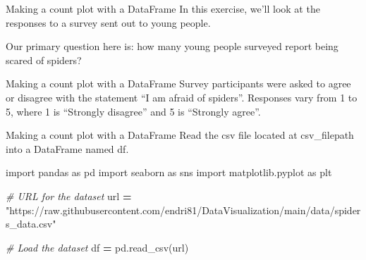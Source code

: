 \documentclass[
  ignorenonframetext,
]{beamer}
\newenvironment{Shaded}{\begin{snugshade}}{\end{snugshade}}
\newcommand{\CommentTok}[1]{\textcolor[rgb]{0.56,0.35,0.01}{\textit{#1}}}
\newcommand{\ImportTok}[1]{#1}
\newcommand{\NormalTok}[1]{#1}
\newcommand{\OperatorTok}[1]{\textcolor[rgb]{0.81,0.36,0.00}{\textbf{#1}}}
\newcommand{\StringTok}[1]{\textcolor[rgb]{0.31,0.60,0.02}{#1}}
\begin{document}
\begin{frame}{Making a count plot with a DataFrame}
\label{making-a-count-plot-with-a-dataframe}
In this exercise, we'll look at the responses to a survey sent out to
young people.

Our primary question here is: how many young people surveyed report
being scared of spiders?
\end{frame}

\begin{frame}{Making a count plot with a DataFrame}
\label{making-a-count-plot-with-a-dataframe-1}
Survey participants were asked to agree or disagree with the statement
``I am afraid of spiders''. Responses vary from 1 to 5, where 1 is
``Strongly disagree'' and 5 is ``Strongly agree''.
\end{frame}

\begin{frame}[fragile]{Making a count plot with a DataFrame}
\label{making-a-count-plot-with-a-dataframe-2}
Read the csv file located at csv\_filepath into a DataFrame named df.


\begin{Shaded}
\begin{Highlighting}[]
\ImportTok{import}\NormalTok{ pandas }\ImportTok{as}\NormalTok{ pd}
\ImportTok{import}\NormalTok{ seaborn }\ImportTok{as}\NormalTok{ sns}
\ImportTok{import}\NormalTok{ matplotlib.pyplot }\ImportTok{as}\NormalTok{ plt}

\CommentTok{\# URL for the dataset}
\NormalTok{url }\OperatorTok{=} \StringTok{"https://raw.githubusercontent.com/endri81/DataVisualization/main/data/spiders\_data.csv"}

\CommentTok{\# Load the dataset}
\NormalTok{df }\OperatorTok{=}\NormalTok{ pd.read\_csv(url)}
\end{Highlighting}
\end{Shaded}
\end{frame}
\end{document}
